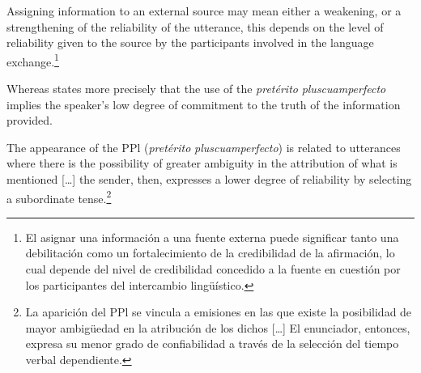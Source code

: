 \documentclass[output=paper]{langsci/langscibook}
\begin{document}
\begin{displayquote}
Assigning information to an external source may mean either a weakening, or a strengthening of the reliability of the utterance, this depends on the level of reliability given to the source by the participants involved in the language exchange.\footnote{El asignar una información a una fuente externa puede significar tanto una debilitación como un fortalecimiento de la credibilidad de la afirmación, lo cual depende del nivel de credibilidad concedido a la fuente en cuestión por los participantes del intercambio lingüístico.}	
\end{displayquote}

Whereas \citet[111]{Speranza2014} states more precisely that the use of the \textit{pretérito} \textit{pluscuamperfecto} implies the speaker’s low degree of commitment to the truth of the information provided. 

\begin{displayquote}
The appearance of the PPl (\textit{pretérito} \textit{pluscuamperfecto}) is related to utterances where there is the possibility of greater ambiguity in the attribution of what is mentioned […] the sender, then, expresses a lower degree of reliability by selecting a subordinate tense.\footnote{La aparición del PPl se vincula a emisiones en las que existe la posibilidad de mayor ambigüedad en la atribución de los dichos […] El enunciador, entonces, expresa su menor grado de confiabilidad a través de la selección del tiempo verbal dependiente.}	
\end{displayquote}
\end{document}
